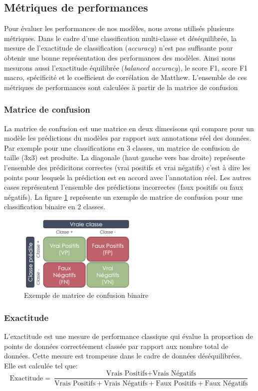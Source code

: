 \subsection{Métriques de performances}
Pour évaluer les performances de nos modèles, nous avons utilisés plusieurs métriques. Dans le cadre d'une classification multi-classe et déséquilibrée, la mesure de l'exactitude de classification (\textit{accuracy}) n'est pas suffisante pour obtenir une bonne représentation des performances des modèles. Ainsi nous mesurons aussi l'exactitude équilibrée (\textit{balanced accuracy}), le score F1, score F1 macro, spécificité et le coefficient de corrélation de Matthew. L'ensemble de ces métriques de performances sont calculées à partir de la matrice de confusion

\subsubsection{Matrice de confusion}
La matrice de confusion est une matrice en deux dimesisons qui compare pour un modèle les prédictions du modèles par rapport aux annotations réel des données. Par exemple pour une classifications en 3 classes, un matrice de confusion de taille (3x3) est produite. La diagonale (haut gauche vers bas droite) représente l'ensemble des prédicitons correctes (vrai positifs et vrai négatifs) c'est à dire les points pour lesquels la prédiction est en accord avec l'annotation réel. Les autres cases représentent l'ensemble des prédictions incorrectes (faux positifs ou faux négatifs). La figure \ref{fig:confusion-example}  représente un exemple de matrice de confusion pour une classification binaire en 2 classes.
\begin{figure}[!htbp]
 \centering
 \includegraphics[width=0.5\textwidth]{figures/confusion_example.png}
 \caption[Exemple de matrice de confusion binaire]{Exemple de matrice de confusion binaire}
 \label{fig:confusion-example}
\end{figure}

\subsubsection{Exactitude}
L'exactitude est une mesure de performance classique qui évalue la proportion de points de données correctéement classée par rapport aux nombre total de données. Cette mesure est trompeuse dans le cadre de données déséquilibrées. Elle est calculée tel que:
\[ \text{Exactitude} = \frac{\text{Vrais Positifs} + \text{Vrais Négatifs}}{\text{Vrais Positifs} + \text{Vrais Négatifs} + \text{Faux Positifs} + \text{Faux Négatifs}} \]

